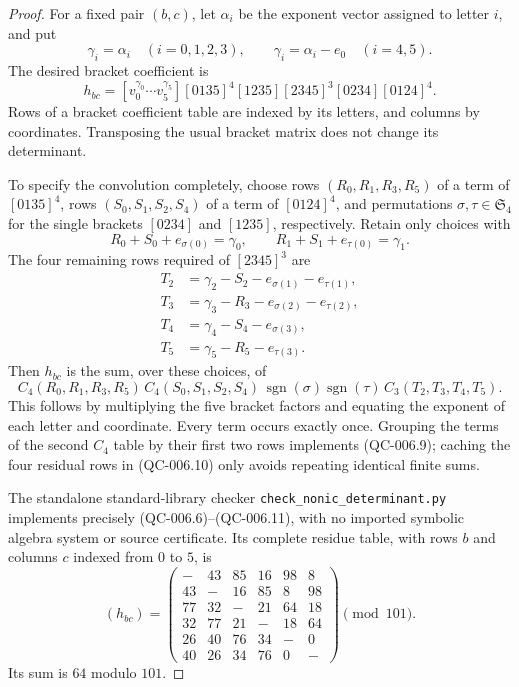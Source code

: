\begin{proof}
For a fixed pair $(b,c)$, let $\alpha_i$ be the exponent vector
assigned to letter $i$, and put
\[
 \gamma_i=\alpha_i\quad(i=0,1,2,3),\qquad
 \gamma_i=\alpha_i-e_0\quad(i=4,5).
 \tag{QC-006.7}
\]
The desired bracket coefficient is
\[
 h_{bc}=[v_0^{\gamma_0}\cdots v_5^{\gamma_5}]
 [0135]^4[1235][2345]^3[0234][0124]^4.
 \tag{QC-006.8}
\]
Rows of a bracket coefficient table are indexed by its letters,
and columns by coordinates. Transposing the usual bracket
matrix does not change its determinant.

To specify the convolution completely, choose rows
$(R_0,R_1,R_3,R_5)$ of a term of $[0135]^4$, rows
$(S_0,S_1,S_2,S_4)$ of a term of $[0124]^4$, and permutations
$\sigma,\tau\in\mathfrak S_4$ for the single brackets
$[0234]$ and $[1235]$, respectively. Retain only choices with
\[
 R_0+S_0+e_{\sigma(0)}=\gamma_0,
 \qquad
 R_1+S_1+e_{\tau(0)}=\gamma_1.
 \tag{QC-006.9}
\]
The four remaining rows required of $[2345]^3$ are
\[
 \begin{split}
 T_2&=\gamma_2-S_2-e_{\sigma(1)}-e_{\tau(1)},\\
 T_3&=\gamma_3-R_3-e_{\sigma(2)}-e_{\tau(2)},\\
 T_4&=\gamma_4-S_4-e_{\sigma(3)},\\
 T_5&=\gamma_5-R_5-e_{\tau(3)}.
 \end{split}
 \tag{QC-006.10}
\]
Then $h_{bc}$ is the sum, over these choices, of
\[
 C_4(R_0,R_1,R_3,R_5)\,
 C_4(S_0,S_1,S_2,S_4)\,
 \operatorname{sgn}(\sigma)\operatorname{sgn}(\tau)\,
 C_3(T_2,T_3,T_4,T_5).
 \tag{QC-006.11}
\]
This follows by multiplying the five bracket factors and
equating the exponent of each letter and coordinate. Every
term occurs exactly once. Grouping the terms of the second
$C_4$ table by their first two rows implements
(QC-006.9); caching the four residual rows in (QC-006.10)
only avoids repeating identical finite sums.

The standalone standard-library checker
\texttt{check\_nonic\_determinant.py} implements precisely
(QC-006.6)--(QC-006.11), with no imported symbolic algebra
system or source certificate. Its complete residue table,
with rows $b$ and columns $c$ indexed from $0$ to $5$, is
\[
 (h_{bc})=\begin{pmatrix}
 -&43&85&16&98&8\\
 43&-&16&85&8&98\\
 77&32&-&21&64&18\\
 32&77&21&-&18&64\\
 26&40&76&34&-&0\\
 40&26&34&76&0&-
 \end{pmatrix}\pmod {101}.
 \tag{QC-006.12}
\]
Its sum is $64$ modulo $101$.


\end{proof}
